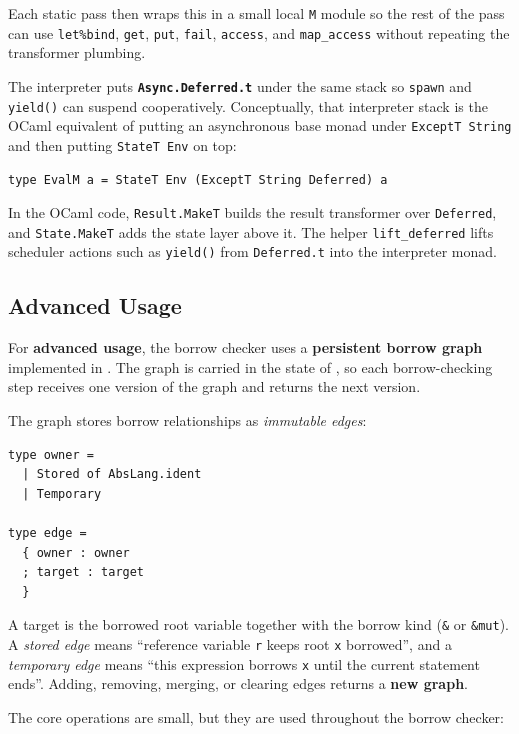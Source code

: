 \documentclass[a4paper]{article}
\begin{document}
Each static pass then wraps this in a small local \texttt{M} module so the rest
of the pass can use \texttt{let\%bind}, \texttt{get}, \texttt{put},
\texttt{fail}, \texttt{access}, and \texttt{map\_access} without repeating the
transformer plumbing.

The interpreter puts \textbf{\texttt{Async.Deferred.t}} under the same stack so
\texttt{spawn} and \texttt{yield()} can suspend cooperatively. Conceptually,
that interpreter stack is the OCaml equivalent of putting an asynchronous base
monad under \texttt{ExceptT String} and then putting \texttt{StateT Env} on top:

\begin{lstlisting}
type EvalM a = StateT Env (ExceptT String Deferred) a
\end{lstlisting}

In the OCaml code, \texttt{Result.MakeT} builds the result transformer over
\texttt{Deferred}, and \texttt{State.MakeT} adds the state layer above it. The
helper \texttt{lift\_deferred} lifts scheduler actions such as \texttt{yield()}
from \texttt{Deferred.t} into the interpreter monad.

\subsection{Advanced Usage}

For \textbf{advanced usage}, the borrow checker uses a \textbf{persistent borrow
graph} implemented in . The graph is carried
in the state of , so each borrow-checking step
receives one version of the graph and returns the next version.

The graph stores borrow relationships as \emph{immutable edges}:

\begin{lstlisting}
type owner =
  | Stored of AbsLang.ident
  | Temporary

type edge =
  { owner : owner
  ; target : target
  }
\end{lstlisting}

A target is the borrowed root variable together with the borrow kind
(\texttt{\&} or \texttt{\&mut}). A \emph{stored edge} means ``reference variable
\texttt{r} keeps root \texttt{x} borrowed'', and a \emph{temporary edge} means
``this expression borrows \texttt{x} until the current statement ends''.
Adding, removing, merging, or clearing edges returns a \textbf{new graph}.

The core operations are small, but they are used throughout the borrow checker:
\end{document}

